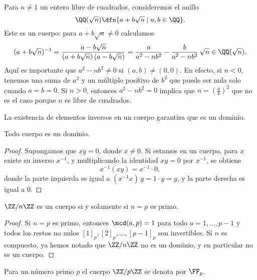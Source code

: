 \begin{ejemplo}
  Para $n\ne 1$ un entero libre de cuadrados, consideremos el anillo
  $$\QQ (\sqrt{n}) \dfn \{ a + b\sqrt{n} \mid a,b\in \QQ \}.$$
  Este es un cuerpo: para $a + b\sqrt{n} \ne 0$ calculamos
  \[ (a + b\sqrt{n})^{-1} =
    \frac{a - b\sqrt{n}}{(a + b\sqrt{n})\,(a - b\sqrt{n})} =
    \frac{a}{a^2-nb^2} - \frac{b}{a^2-nb^2}\,\sqrt{n} \in \QQ (\sqrt{n}). \]
  Aquí es importante que $a^2 - nb^2 \ne 0$ si $(a,b) \ne (0,0)$. En efecto,
  si $n < 0$, tenemos una suma de $a^2$ y un múltiplo positivo de $b^2$ que
  puede ser nula solo cuando $a = b = 0$. Si $n > 0$, entonces $a^2 - nb^2 = 0$
  implica que $n = \left(\frac{a}{b}\right)^2$ que no es el caso porque $n$ es
  libre de cuadrados.
\end{ejemplo}

La existencia de elementos inversos en un cuerpo garantiza que es un dominio.

\begin{observacion}
  Todo cuerpo es un dominio.

  \begin{proof}
    Supongamos que $xy = 0$, donde $x \ne 0$. Si estamos en un cuerpo, para $x$
    existe su inverso $x^{-1}$, y multiplicando la identidad $xy = 0$ por
    $x^{-1}$, se obtiene
    $$x^{-1} (xy) = x^{-1}\cdot 0,$$
    donde la parte izquierda es igual a $(x^{-1} x)\,y = 1\cdot y = y$,
    y la parte derecha es igual a $0$.
  \end{proof}
\end{observacion}

\begin{proposicion}
  $\ZZ/n\ZZ$ es un cuerpo si y solamente si $n = p$ es primo.

  \begin{proof}
    Si $n = p$ es primo, entonces $\mcd (a,p) = 1$ para todo $a = 1,\ldots,p-1$
    y todos los restos no nulos $[1]_p, [2]_p, \ldots, [p-1]_p$ son
    invertibles. Si $n$ es compuesto, ya hemos notado que $\ZZ/n\ZZ$ no es un
    dominio, y en particular no es un cuerpo.
  \end{proof}
\end{proposicion}

\begin{notacion}
  Para un número primo $p$ el cuerpo $\ZZ/p\ZZ$ se denota por $\FF_p$.
\end{notacion}

